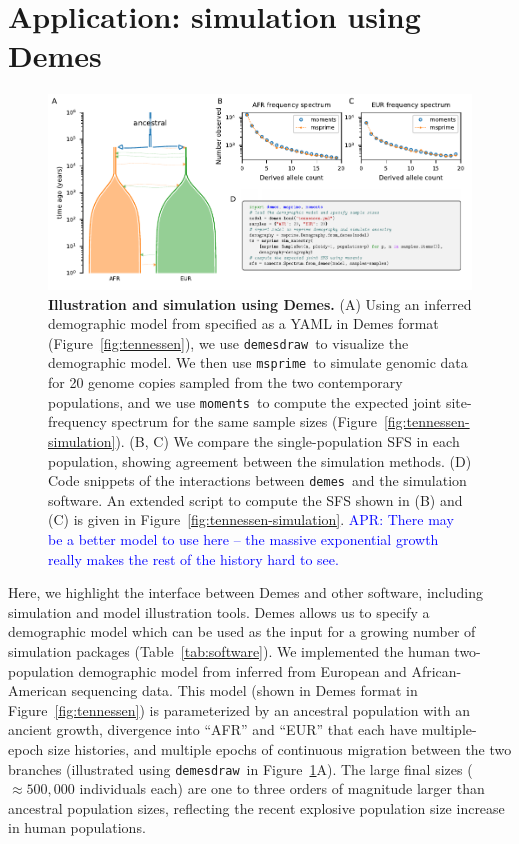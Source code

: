 \documentclass[11pt]{article}
\newcommand{\msprime}[0]{\texttt{msprime}}
\newcommand{\demes}[0]{\texttt{demes}}
\newcommand{\demesdraw}[0]{\texttt{demesdraw}}
\newcommand{\moments}[0]{\texttt{moments}}
\newcommand{\aprcomment}[1]{{\textcolor{blue}{APR: #1}}}
\begin{document}
\section*{Application: simulation using Demes}

\begin{figure}[tb!]
    \centering
    \includegraphics{fig/showcase}
    \caption{
        \textbf{Illustration and simulation using Demes.}
        (A)
        Using an inferred demographic model from \citet{tennessen2012evolution}
        specified as a YAML in Demes format (Figure~\ref{fig:tennessen}), we
        use \demesdraw\ to visualize the demographic model.
        We then use \msprime\ to simulate genomic data for 20 genome copies
        sampled from the two contemporary populations, and we use \moments\
        to compute the expected joint site-frequency spectrum for the same
        sample sizes (Figure~\ref{fig:tennessen-simulation}).
        (B, C) We compare the single-population SFS in each population, showing
        agreement between the simulation methods.
        (D) Code snippets of the interactions between \demes\ and the simulation
        software. An extended script to compute the SFS shown in (B) and (C) is
        given in Figure~\ref{fig:tennessen-simulation}.
        \aprcomment{There may be a better model to use here -- the massive
        exponential growth really makes the rest of the history hard to see.}
    }
    \label{fig:showcase}
\end{figure}

Here, we highlight the interface between Demes and other software, including
simulation and model illustration tools. Demes allows us to specify a
demographic model which can be used as the input for a growing
number of simulation packages (Table~\ref{tab:software}). We implemented the
human two-population demographic model from \citet{tennessen2012evolution}
inferred from European and African-American sequencing data. This model (shown
in Demes format in Figure~\ref{fig:tennessen}) is parameterized by an ancestral
population with an ancient growth, divergence into ``AFR'' and ``EUR'' that
each have multiple-epoch size histories, and multiple epochs of continuous
migration between the two branches (illustrated using \demesdraw\ in
Figure~\ref{fig:showcase}A). The large final sizes (\(\approx 500,000\)
individuals each) are one to three orders of magnitude larger than ancestral
population sizes, reflecting the recent explosive population size increase in
human populations.
\end{document}
